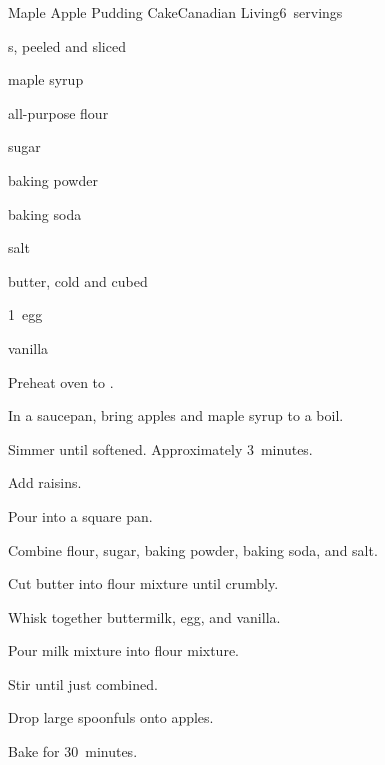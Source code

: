 \begin{recipe}{Maple Apple Pudding Cake}{Canadian Living}{6~servings}

\begin{ingredients}
\item {} s, peeled and sliced
\item \C{\twothird} maple syrup
\item \C{\third} 
\item {} all-purpose flour
\item \C{\quarter} sugar
\item \tp{1\half} baking powder
\item \tp{\half} baking soda
\item \tp{\quarter} salt
\item \C{\quarter} butter, cold and cubed
\item \C{\half} 
\item 1~egg
\item {} vanilla
\end{ingredients}

\begin{directions}
\item Preheat oven to .
\item In a saucepan, bring apples and maple syrup to a boil.
\item Simmer until softened. Approximately 3~minutes.
\item Add raisins.
\item Pour into a  square pan.
\item Combine flour, sugar, baking powder, baking soda, and salt.
\item Cut butter into flour mixture until crumbly.
\item Whisk together buttermilk, egg, and vanilla.
\item Pour milk mixture into flour mixture.
\item Stir until just combined.
\item Drop large spoonfuls onto apples.
\item Bake for 30~minutes.
\end{directions}

\end{recipe}
